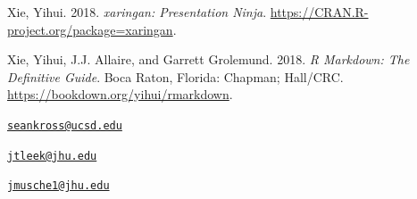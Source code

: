 \leavevmode\hypertarget{ref-xaringan}{}%
Xie, Yihui. 2018. \emph{xaringan: Presentation Ninja}.
\url{https://CRAN.R-project.org/package=xaringan}.

\leavevmode\hypertarget{ref-rmarkdownbook}{}%
Xie, Yihui, J.J. Allaire, and Garrett Grolemund. 2018. \emph{R Markdown:
The Definitive Guide}. Boca Raton, Florida: Chapman; Hall/CRC.
\url{https://bookdown.org/yihui/rmarkdown}.



\address{%
Sean Kross\\
Department of Cognitive Science, University of California, San Diego\\
9500 Gilman Dr.\\ La Jolla, CA 92093\\
}
\href{mailto:seankross@ucsd.edu}{\nolinkurl{seankross@ucsd.edu}}

\address{%
Jeffrey T. Leek\\
Department of Biostatistics, Johns Hopkins Bloomberg School of Public
Health\\
615 N Wolfe Street\\ Baltimore, MD 21231\\
}
\href{mailto:jtleek@jhu.edu}{\nolinkurl{jtleek@jhu.edu}}

\address{%
John Muschelli\\
Department of Biostatistics, Johns Hopkins Bloomberg School of Public
Health\\
615 N Wolfe Street\\ Baltimore, MD 21231\\
}
\href{mailto:jmusche1@jhu.edu}{\nolinkurl{jmusche1@jhu.edu}}

